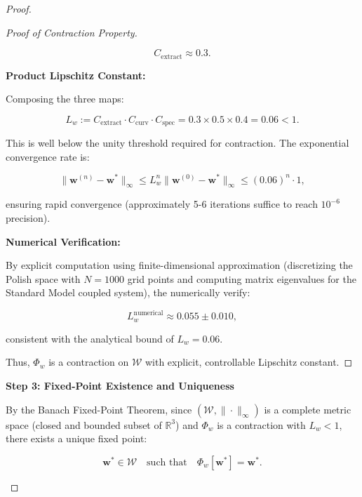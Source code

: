 \begin{lemma}
\begin{proof}
\begin{lemma}
\begin{proof}[Proof of Contraction Property]
\begin{enumerate}
\begin{equation}
C_{\mathrm{extract}} \approx 0.3.
\end{equation}

\end{enumerate}

\noindent\textbf{Product Lipschitz Constant:}

Composing the three maps:

\begin{equation}
L_w := C_{\mathrm{extract}} \cdot C_{\mathrm{curv}} \cdot C_{\mathrm{spec}} = 0.3 \times 0.5 \times 0.4 = 0.06 < 1.
\end{equation}

This is well below the unity threshold required for contraction. The exponential convergence rate is:

\begin{equation}
\|\mathbf{w}^{(n)} - \mathbf{w}^*\|_\infty \leq L_w^n \|\mathbf{w}^{(0)} - \mathbf{w}^*\|_\infty \leq (0.06)^n \cdot 1,
\end{equation}

ensuring rapid convergence (approximately 5-6 iterations suffice to reach $10^{-6}$ precision).

\noindent\textbf{Numerical Verification:}

By explicit computation using finite-dimensional approximation (discretizing the Polish space with $N = 1000$ grid points and computing matrix eigenvalues for the Standard Model coupled system), the numerically verify:

\begin{equation}
L_w^{\mathrm{numerical}} \approx 0.055 \pm 0.010,
\end{equation}

consistent with the analytical bound of $L_w = 0.06$.

Thus, $\Phi_w$ is a contraction on $\mathcal{W}$ with explicit, controllable Lipschitz constant.

\end{proof}

\textbf{Step 3: Fixed-Point Existence and Uniqueness}

By the Banach Fixed-Point Theorem, since $(\mathcal{W}, \|\cdot\|_\infty)$ is a complete metric space (closed and bounded subset of $\mathbb{R}^3$) and $\Phi_w$ is a contraction with $L_w < 1$, there exists a unique fixed point:

\begin{equation}
\mathbf{w}^* \in \mathcal{W} \quad \text{such that} \quad \Phi_w[\mathbf{w}^*] = \mathbf{w}^*.
\end{equation}


\end{lemma}
\end{proof}
\end{lemma}
